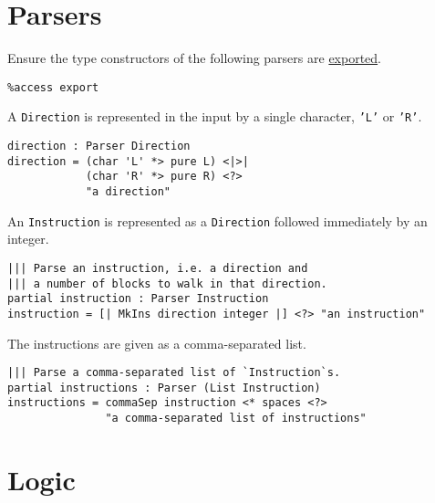 \section{Parsers}\label{parsers}

Ensure the type constructors of the following parsers are
\href{http://docs.idris-lang.org/en/latest/tutorial/modules.html\#meaning-for-data-types}{exported}.

\begin{verbatim}
%access export
\end{verbatim}

A \texttt{Direction} is represented in the input by a
single character, \texttt{'L'} or
\texttt{'R'}.

\begin{verbatim}
direction : Parser Direction
direction = (char 'L' *> pure L) <|>|
            (char 'R' *> pure R) <?>
            "a direction"
\end{verbatim}

\newpage

An \texttt{Instruction} is represented as a
\texttt{Direction} followed immediately by an integer.

\begin{verbatim}
||| Parse an instruction, i.e. a direction and
||| a number of blocks to walk in that direction.
partial instruction : Parser Instruction
instruction = [| MkIns direction integer |] <?> "an instruction"
\end{verbatim}

The instructions are given as a comma-separated list.

\begin{verbatim}
||| Parse a comma-separated list of `Instruction`s.
partial instructions : Parser (List Instruction)
instructions = commaSep instruction <* spaces <?>
               "a comma-separated list of instructions"
\end{verbatim}

\section{Logic}\label{logic}

